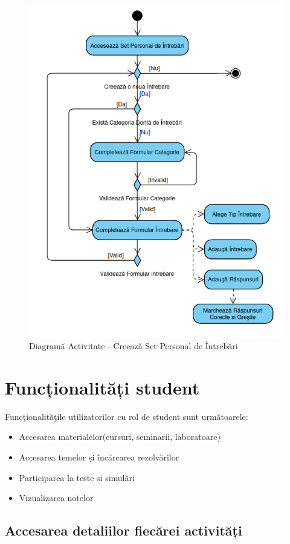 \documentclass[12pt, a4paper, oneside, romanian]{teza-upb}
\begin{document}
\begin{figure}[H]
\centering
\includegraphics*[width=0.75\columnwidth]{diagrama-activitate-creeaza-set-personal-de-intrebari}
\caption{Diagramă Activitate - Creează Set Personal de Întrebări}
\label{diagrama-activitate-creeaza-set-personal-de-intrebari}
\end{figure}

\section{Funcționalități student}

Funcţionalităţile utilizatorilor cu rol de student sunt următoarele:
\begin{itemize}
	\item Accesarea materialelor(cursuri, seminarii, laboratoare)
	\item Accesarea temelor și încărcarea rezolvărilor
	\item Participarea la teste și simulări
	\item Vizualizarea notelor
\end{itemize}

\subsection{Accesarea detaliilor fiecărei activități}
\end{document}
